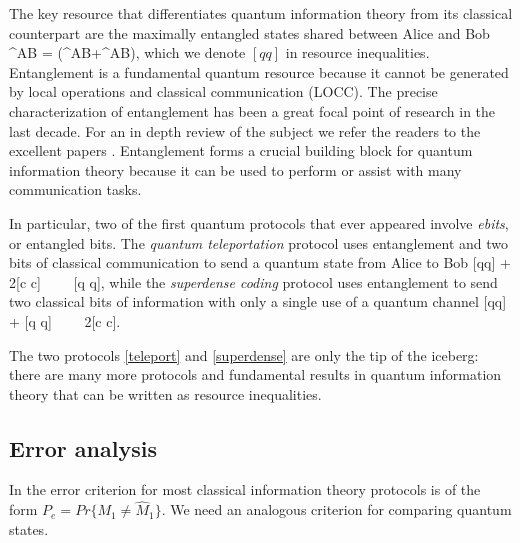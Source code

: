\documentclass[aps,11pt,twoside,letterpaper]{article}
\begin{document}
			The key resource that differentiates quantum information theory 
            from its classical counterpart are the maximally entangled states shared between 
			Alice and Bob 
			\be
				\ket{\Phi}^{AB} = (^{AB}+^{AB}),
			\ee
			which we denote $[qq]$ in resource inequalities.  
			Entanglement is a fundamental quantum resource because it cannot be generated by local operations and
			classical communication (LOCC). 
			The precise characterization of entanglement has been a great focal point of research in the last decade.
			For an in depth review of the subject we refer the readers to the excellent papers \cite{VP98, HHHH}.
			Entanglement forms a crucial building block for quantum information theory because it can be used 
			to perform or assist with many communication tasks.

            In particular, two of the first quantum protocols that ever appeared involve \emph{ebits}, 
            or entangled bits.  
            The \emph{quantum teleportation} protocol \cite{teleportation} uses entanglement and two bits of classical
            communication to send a quantum state from Alice to Bob
            \be	{}	\label{teleport}
                [qq] + 2[c \to c]	\ \ \geq \ \ 	[q \to q],
            \ee
            while the \emph{superdense coding} protocol \cite{superdense} uses entanglement to send two classical
            bits of information with only a single use of a quantum channel
            \be	{}	\label{superdense}
                [qq] + [q \to q]	\ \ \geq \ \ 	2[c \to c].
            \ee

            The two protocols \eqref{teleport} and \eqref{superdense} are only the tip of the iceberg: 
            there are many more protocols and fundamental results in quantum information theory that can be 
            written as resource inequalities.
                        
			

		\bigskip		
		\subsection{Error analysis}		\label{subsection:distance-measures}
    
            In the error criterion for most classical information theory protocols is of the form 
            $P_e = Pr\{ M_1 \neq \hat{M}_1 \}$.
            We need an analogous criterion for comparing quantum states.
\end{document}
